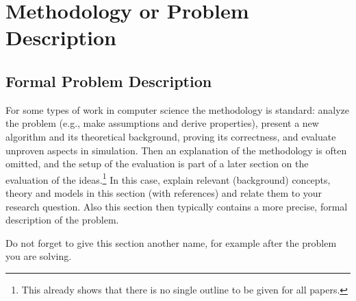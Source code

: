 \section{Methodology or Problem Description}

\subsection{Formal Problem Description}
For some types of work in computer science the methodology is standard: analyze the problem (e.g., make assumptions and derive properties), present a new algorithm and its theoretical background, proving its correctness, and evaluate unproven aspects in simulation.
Then an explanation of the methodology is often omitted, and the setup of the evaluation is part of a later section on the evaluation of the ideas.\footnote{This already shows that there is no single outline to be given for all papers.}
In this case, explain relevant (background) concepts, theory and models in this section (with references) and relate them to your research question.
Also this section then typically contains a more precise, formal description of the problem.

Do not forget to give this section another name, for example after the problem you are solving.
